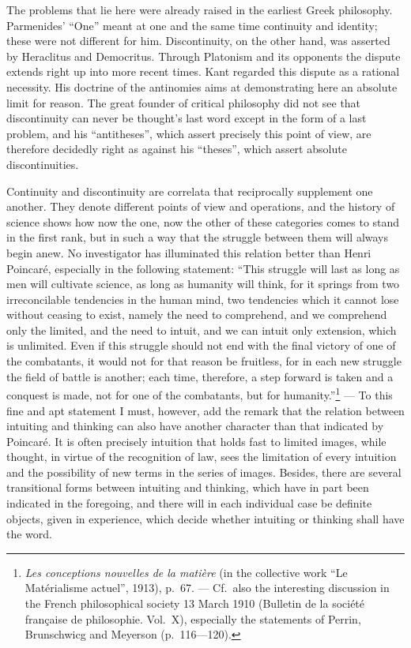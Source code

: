 \documentclass[12pt]{article}
\newcommand{\opage}[1]{\marginnote{\footnotesize\textit{[#1]}}}
\begin{document}
The problems that lie here were already raised in the earliest Greek
philosophy. Parmenides' ``One'' meant at one and the same time continuity
and identity; these were not different for him. Discontinuity, on the other
hand, was asserted by Heraclitus and Democritus. Through Platonism and its
opponents the dispute extends right up into more recent times. Kant regarded
this dispute as a rational necessity. His doctrine of the antinomies aims at
demonstrating here an absolute limit for reason. The great founder of
critical philosophy did not see that discontinuity can never be thought's
last word except in the form of a last problem, and his ``antitheses'',
which assert precisely this point of view, are therefore decidedly right as
against his ``theses'', which assert absolute discontinuities.

Continuity and discontinuity are correlata that reciprocally supplement one
another. They denote different points of view and operations, and the
history of science shows how now the one, now the other of these categories
comes to stand in the first rank, but in such a way that the struggle
between them will always begin anew. No investigator has illuminated this
relation better than Henri Poincaré, especially in the following statement:
``This struggle will last as long as men will cultivate \opage{31}science, as long as
humanity will think, for it springs from two irreconcilable tendencies in
the human mind, two tendencies which it cannot lose without ceasing to
exist, namely the need to comprehend, and we comprehend only the limited,
and the need to intuit, and we can intuit only extension, which is
unlimited. Even if this struggle should not end with the final victory of
one of the combatants, it would not for that reason be fruitless, for in
each new struggle the field of battle is another; each time, therefore, a
step forward is taken and a conquest is made, not for one of the combatants,
but for humanity.''\footnote{\textit{Les conceptions nouvelles de la
matière} (in the collective work ``Le Matérialisme actuel'', 1913), p.~67.
--- Cf.\ also the interesting discussion in the French philosophical society
13 March 1910 (Bulletin de la société française de philosophie. Vol.~X),
especially the statements of Perrin, Brunschwicg and Meyerson
(p.~116---120).} --- To this fine and apt statement I must, however, add the
remark that the relation between intuiting and thinking can also have
another character than that indicated by Poincaré. It is often precisely
intuition that holds fast to limited images, while thought, in virtue of the
recognition of law, sees the limitation of every intuition and the
possibility of new terms in the series of images. Besides, there are several
transitional forms between intuiting and thinking, which have in part been
indicated in the foregoing, and there will in each individual case be
definite objects, given in experience, which decide whether intuiting or
thinking shall have the word.
\end{document}
